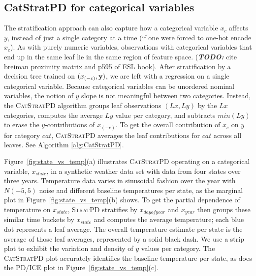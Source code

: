 \documentclass[12pt]{article}
\newcommand{\figref}[1]{Figure~\ref{#1}}
\newcommand{\todo}[1]{{\bf\em TODO:} {{#1}}}
\newcommand{\spd}{\fontfamily{cmr}\textsc{\small StratPD}}
\newcommand{\cspd}{\fontfamily{cmr}\textsc{\small CatStratPD}}
\newcommand{\xnc}{$x_{(-c)}$}
\begin{document}
\subsection{CatStratPD for categorical variables}

The stratification approach can also capture how a categorical variable $x_c$ affects $y$, instead of just a single category at a time (if one were forced to one-hot encode $x_c$). As with purely numeric variables, observations with categorical variables that end up in the same leaf lie in the same region of feature space. (\todo cite breiman proximity matrix and p595 of ESL book). After stratification by a decision tree trained on $(x_{(-c)}, {\bf y})$, we are left with a regression on a single categorical variable. Because categorical variables can be unordered nominal variables, the notion of $y$ slope is not meaningful between two categories. Instead, the \cspd{} algorithm groups leaf observations $(Lx, Ly)$ by the $Lx$ categories, computes the average $Ly$ value per category, and subtracts $min(Ly)$ to erase the $y$-contributions of \xnc{}.  To get the overall contribution of $x_c$ on $y$ for category $cat$,  \cspd{} averages the leaf contributions for $cat$ across all leaves. See Algorithm \ref{alg:CatStratPD}.

\figref{fig:state_vs_temp}(a) illustrates \cspd{} operating on a categorical variable, $x_{state}$, in a synthetic weather data set with data from four states over three years. Temperature data varies in sinusoidal fashion over the year with $N(-5,5)$ noise and different baseline temperatures per state, as the marginal plot in \figref{fig:state_vs_temp}(b) shows. To get the partial dependence of temperature on $x_{state}$, \spd{} stratifies by $x_{dayofyear}$ and $x_{year}$ then groups these similar time buckets by $x_{state}$ and computes the average temperature; each blue dot represents a leaf average. The overall temperature estimate per state is the average of those leaf averages, represented by a solid black dash. We use a strip plot to exhibit the variation and density of $y$ values per category. The \cspd{} plot accurately identifies the baseline temperature per state, as does the PD/ICE plot in \figref{fig:state_vs_temp}(c).
\end{document}
